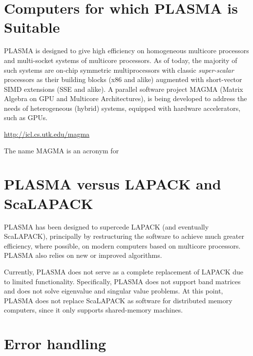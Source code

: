 
\section{Computers for which PLASMA is Suitable}

PLASMA is designed to give high efficiency on homogeneous multicore processors and \mbox{multi-socket}
systems of multicore processors. As of today, the majority of such systems are \mbox{on-chip} symmetric
multiprocessors with classic \mbox{\em super-scalar} processors as their building blocks (x86 and alike)
augmented with \mbox{short-vector} SIMD extensions (SSE and alike).
A parallel software project MAGMA (Matrix Algebra on GPU and Multicore
Architectures), is being developed to address the needs of
heterogeneous (hybrid) systems, equipped with hardware accelerators,
such as GPUs.
\begin{link_url}
\url{http://icl.cs.utk.edu/magma}
\end{link_url}
The name MAGMA is an acronym for


\section{PLASMA versus LAPACK and ScaLAPACK}

PLASMA has been designed to supercede LAPACK (and eventually ScaLAPACK), principally by restructuring the software
to achieve much greater efficiency, where possible, on modern computers based on multicore processors.
PLASMA also relies on new or improved algorithms.

Currently, PLASMA does not serve as a complete replacement of LAPACK due to limited functionality.
Specifically, PLASMA does not support band matrices and does not solve eigenvalue and singular
value problems.
At this point, PLASMA does not replace ScaLAPACK as software for distributed memory computers, since it
only supports \mbox{shared-memory} machines.


\section{Error handling}

